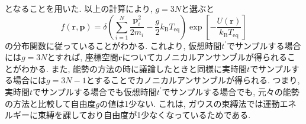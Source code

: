 となることを用いた.
以上の計算により, $g = 3N$と選ぶと
\begin{equation}
    f(\bm{r}, \bm{p})
    =
    \delta
    \left(
        \sum_{i=1}^{N}
        \frac{\bm{p}_{i}^{2}}{2m_{i}}
        -
        \frac{g}{2} k_{\mathrm{B}} T_{\mathrm{eq}}
    \right)
    \exp
    \left[
        - \frac{U(\bm{r})}{k_{\mathrm{B}} T_{\mathrm{eq}}}
    \right]
\end{equation}
の分布関数に従っていることがわかる.
これより, 仮想時間$t^{\prime}$でサンプルする場合には$g = 3N$とすれば, 座標空間$\bm{r}$についてカノニカルアンサンブルが得られることがわかる.
また, 能勢の方法の時に議論したときと同様に実時間$t$でサンプルする場合には$g = 3N-1$とすることでカノニカルアンサンブルが得られる.
つまり, 実時間$t$でサンプルする場合でも仮想時間$t^{\prime}$でサンプルする場合でも, 元々の能勢の方法と比較して自由度$g$の値は1少ない.
これは, ガウスの束縛法では運動エネルギーに束縛を課しており自由度が1少なくなっているためである.






